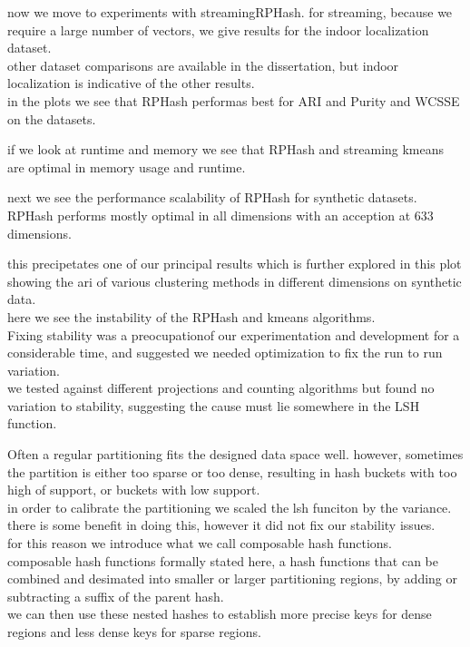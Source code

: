 \documentclass{beamer}
\begin{document}
\begin{frame}[plain]
now we move to experiments with streamingRPHash. for streaming, because we require
a large number of vectors, we give results for the indoor localization dataset.\\

other dataset comparisons are available in the dissertation, but indoor localization
is indicative of the other results.\\

in the plots we see that RPHash performas best for
ARI and Purity and WCSSE on the datasets.
\end{frame}

\begin{frame}[plain]
if we look at runtime and memory we see that RPHash and streaming kmeans are
optimal in memory usage and runtime.
\end{frame}

\begin{frame}[plain]
next we see the performance scalability of RPHash for synthetic datasets.
RPHash performs mostly optimal in all dimensions with an acception at 633 dimensions.
\end{frame}

\begin{frame}[plain]
this precipetates one of our principal results which is further explored in this plot
showing the ari of various clustering methods in different dimensions on synthetic data.\\
here we see the instability of the RPHash and kmeans algorithms. \\
Fixing stability was a
preocupationof our experimentation and development for a considerable time, and suggested we
needed  optimization to fix the run to run variation. \\
we tested against different projections
and counting algorithms but found no variation to stability, suggesting the cause must
lie somewhere in the LSH function.
\end{frame}

\begin{frame}[plain]
Often a regular partitioning fits the designed data space well. however, sometimes
the partition is either too sparse or too dense, resulting in hash buckets with
too high of support, or buckets with low support. \\
in order to calibrate the partitioning
we scaled the lsh funciton by the variance. \\
there is some benefit in doing this,
however it did not fix our stability issues. \\
for this reason we introduce what we
call composable hash functions. \\
composable hash functions formally stated here, a
hash functions that can be combined and desimated into smaller or larger partitioning
regions, by adding or subtracting a suffix of the parent hash. \\
we can then use these
nested hashes to establish more precise keys for dense regions and less dense keys for
sparse regions.
\end{frame}
\end{document}
